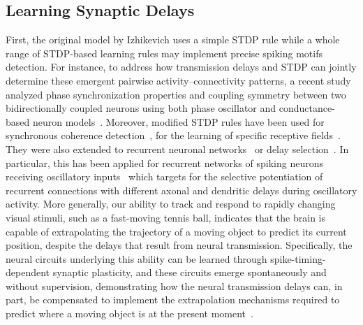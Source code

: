 \documentclass[brainsci, %
               review,accept,pdftex,moreauthors
               ]{Definitions/mdpi}
\begin{document}
\subsection{Learning Synaptic Delays}
First, the original model by Izhikevich uses a simple STDP rule while a whole range of STDP-based learning rules may implement precise spiking motifs detection. For instance, to address how transmission delays and STDP can jointly determine these emergent pairwise activity--connectivity patterns, a recent study analyzed phase synchronization properties and coupling symmetry between two bidirectionally coupled neurons using both phase oscillator and conductance-based neuron models~\citep{madadi_asl_delay-dependent_2022}. Moreover, modified STDP rules have been used for synchronous coherence detection~\citep{perrinet_coherence_2002}, for the learning of specific receptive fields~\citep{perrinet_networks_2001}. They were also extended to recurrent neuronal networks~\citep{gilson_stdp_2010} or delay selection~\citep{datadien_right_2011}. In particular, this has been applied for recurrent networks of spiking neurons receiving oscillatory inputs~\citep{kerr_delay_2013} which targets for the selective potentiation of recurrent connections with different axonal and dendritic delays during oscillatory activity. More generally, our ability to track and respond to rapidly changing visual stimuli, such as a fast-moving tennis ball, indicates that the brain is capable of extrapolating the trajectory of a moving object to predict its current position, despite the delays that result from neural transmission. Specifically, the neural circuits underlying this ability can be learned through spike-timing-dependent synaptic plasticity, and these circuits emerge spontaneously and without supervision, demonstrating how the neural transmission delays can, in part, be compensated to implement the extrapolation mechanisms required to predict where a moving object is at the present moment~\citep{burkitt_predictive_2021}.
\end{document}

